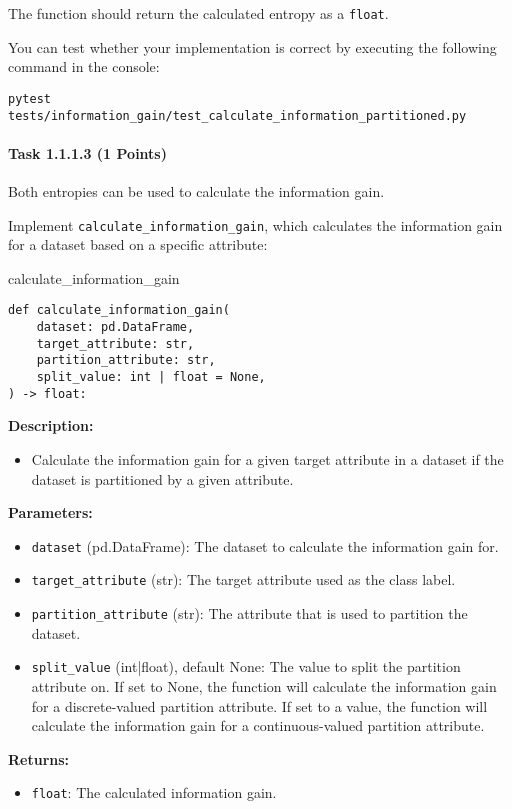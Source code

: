 \documentclass[
english,
smallborders
]{i6prcsht}
\newcommand{\points}[1]{\hfill \color{red}(#1 Points)\color{black}}
\begin{document}
The function should return the calculated entropy as a \texttt{float}.

You can test whether your implementation is correct by executing the following command in the console:

\vspace*{0.3cm}

\begin{lstlisting}
pytest tests/information_gain/test_calculate_information_partitioned.py
\end{lstlisting}

\newpage

\paragraph*{Task 1.1.1.3 \points{1}} \hfill

Both entropies can be used to calculate the information gain.

Implement \texttt{calculate\_information\_gain}, which calculates the information gain for a dataset based on a specific attribute:

\vspace*{0.3cm}

\begin{functionbox}{calculate\_information\_gain}
	\begin{lstlisting}[numbers=none]
def calculate_information_gain(
    dataset: pd.DataFrame, 
    target_attribute: str,
    partition_attribute: str, 
    split_value: int | float = None,
) -> float:
\end{lstlisting}
	
	\textbf{Description:}
	\begin{itemize}[leftmargin=*,topsep=0pt]
		\item Calculate the information gain for a given target attribute in a dataset if the dataset is partitioned by a given attribute.
	\end{itemize}
	
	\textbf{Parameters:}
	\begin{itemize}[leftmargin=*,topsep=0pt]
		\item \texttt{dataset} (pd.DataFrame): The dataset to calculate the information gain for.
		\item \texttt{target\_attribute} (str): The target attribute used as the class label.
		\item \texttt{partition\_attribute} (str): The attribute that is used to partition the dataset.
		\item \texttt{split\_value} (int|float), default None: The value to split the partition attribute on. If set to None, the function will calculate the information gain for a discrete-valued partition attribute. If set to a value, the function will calculate the information gain for a continuous-valued partition attribute.
	\end{itemize}
	
	\textbf{Returns:}
	\begin{itemize}[leftmargin=*,topsep=0pt]
		\item \texttt{float}: The calculated information gain.
	\end{itemize}
\end{functionbox}
\end{document}
